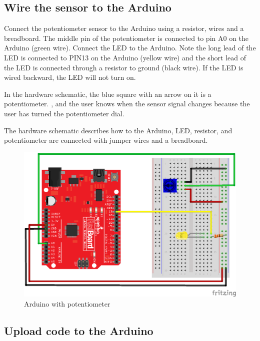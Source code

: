 \documentclass{book}
\makeatletter
\def\maxwidth{\ifdim\Gin@nat@width>\linewidth\linewidth
    \else\Gin@nat@width\fi}
\let\Oldincludegraphics\includegraphics
\renewcommand{\includegraphics}[1]{\Oldincludegraphics[width=.8\maxwidth]{#1}}
\makeatother
\begin{document}
    
        \subsection{Wire the sensor to the
Arduino}\label{wire-the-sensor-to-the-arduino}
    




    
        Connect the potentiometer sensor to the Arduino using a resistor, wires
and a breadboard. The middle pin of the potentiometer is connected to
pin A0 on the Arduino (green wire). Connect the LED to the Arduino. Note
the long lead of the LED is connected to PIN13 on the Arduino (yellow
wire) and the short lead of the LED is connected through a resistor to
ground (black wire). If the LED is wired backward, the LED will not turn
on.

In the hardware schematic, the blue square with an arrow on it is a
potentiometer. , and the user knows when the sensor signal changes
because the user has turned the potentiometer dial.

The hardware schematic describes how to the Arduino, LED, resistor, and
potentiometer are connected with jumper wires and a breadboard.
    




    
        \begin{figure}
\centering
\includegraphics{images/redboard_pot_led_fritzing.png}
\caption{Arduino with potentiometer}
\end{figure}
    




    
        \subsection{Upload code to the
Arduino}\label{upload-code-to-the-arduino}
    
\end{document}

